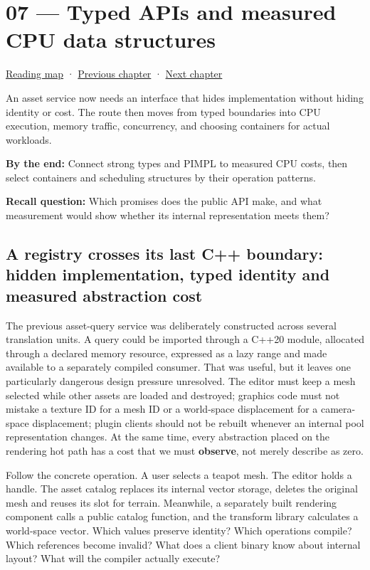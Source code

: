 \hypertarget{05-engine-i-ch007}{}
\chapter{07 --- Typed APIs and measured CPU data structures}\label{05-engine-i-ch007-typed-apis-and-measured-cpu-data-structures}

\hyperref[volume-reading-map]{Reading map} · \hyperref[05-engine-i-ch006]{Previous chapter} · \hyperref[05-engine-i-ch008]{Next chapter}

An asset service now needs an interface that hides implementation without hiding identity or cost. The route then moves from typed boundaries into CPU execution, memory traffic, concurrency, and choosing containers for actual workloads.

\textbf{By the end:} Connect strong types and PIMPL to measured CPU costs, then select containers and scheduling structures by their operation patterns.

\textbf{Recall question:} Which promises does the public API make, and what measurement would show whether its internal representation meets them?

\section{A registry crosses its last C++ boundary: hidden implementation, typed identity and measured abstraction cost}\label{05-engine-i-ch007-a-registry-crosses-its-last-c-boundary-hidden-implementation-typed-identity-and-measured-abstraction-cost}

The previous asset-query service was deliberately constructed across several translation units. A query could be imported through a C++20 module, allocated through a declared memory resource, expressed as a lazy range and made available to a separately compiled consumer. That was useful, but it leaves one particularly dangerous design pressure unresolved. The editor must keep a mesh selected while other assets are loaded and destroyed; graphics code must not mistake a texture ID for a mesh ID or a world-space displacement for a camera-space displacement; plugin clients should not be rebuilt whenever an internal pool representation changes. At the same time, every abstraction placed on the rendering hot path has a cost that we must \textbf{observe}, not merely describe as zero.

Follow the concrete operation. A user selects a teapot mesh. The editor holds a handle. The asset catalog replaces its internal vector storage, deletes the original mesh and reuses its slot for terrain. Meanwhile, a separately built rendering component calls a public catalog function, and the transform library calculates a world-space vector. Which values preserve identity? Which operations compile? Which references become invalid? What does a client binary know about internal layout? What will the compiler actually execute?

